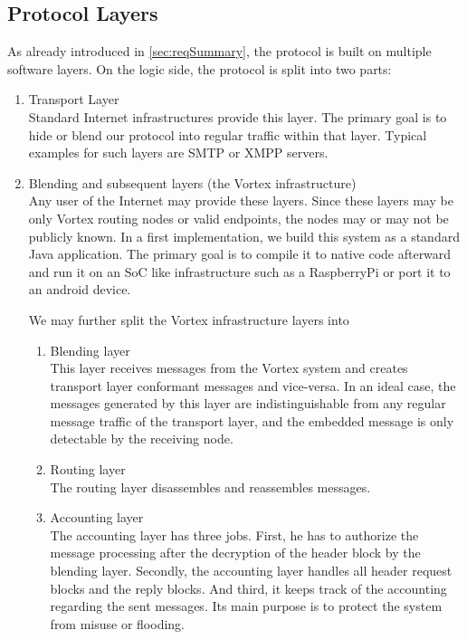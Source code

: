 \subsection{Protocol Layers}
As already introduced in \cref{sec:reqSummary}, the protocol is built on multiple software layers. On the logic side, the protocol is split into two parts:
\begin{enumerate}
	\item Transport Layer\\
	Standard Internet infrastructures provide this layer. The primary goal is to hide or blend our protocol into regular traffic within that layer. Typical examples for such layers are SMTP or XMPP servers.
	\item Blending and subsequent layers (the Vortex infrastructure)\\
	Any user of the Internet may provide these layers. Since these layers may be only Vortex routing nodes or valid endpoints, the nodes may or may not be publicly known. In a first implementation, we build this system as a standard Java application. The primary goal is to compile it to native code afterward and run it on an SoC like infrastructure such as a RaspberryPi or port it to an android device.
	
	We may further split the Vortex infrastructure layers into
	\begin{enumerate}
		\item  Blending layer\\
		This layer receives messages from the Vortex system and creates transport layer conformant messages and vice-versa. In an ideal case, the messages generated by this layer are indistinguishable from any regular message traffic of the transport layer, and the embedded message is only detectable by the receiving node.
		\item Routing layer\\
		The routing layer disassembles and reassembles messages. 
		\item Accounting layer\\
		The accounting layer has three jobs. First, he has to authorize the message processing after the decryption of the header block by the blending layer. Secondly, the accounting layer handles all header request blocks and the reply blocks. And third, it keeps track of the accounting regarding the sent messages. Its main purpose is to protect the system from misuse or flooding.    
	\end{enumerate}
\end{enumerate}

